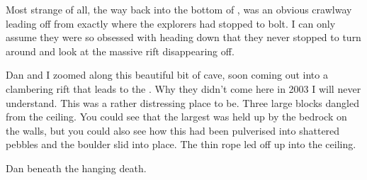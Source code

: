 Most strange of all, the way back into the bottom of ,  was an obvious crawlway leading off
from exactly where the  explorers had stopped to bolt.
I can only assume they were so obsessed with heading down that they
never stopped to turn around and look at the massive rift disappearing
off.

Dan and I zoomed along this beautiful bit of cave, soon coming out into
a clambering rift that leads to the . Why they
didn't come here in 2003 I will never understand. This was a rather
distressing place to be. Three large blocks dangled from the ceiling.
You could see that the largest was held up by the bedrock on the walls,
but you could also see how this had been pulverised into shattered
pebbles and the boulder slid into place. The thin rope led off up into
the ceiling.


\begin{marginfigure}
\checkoddpage \ifoddpage \forcerectofloat \else \forceversofloat \fi
\centering
 \caption{Dan beneath the hanging death. }
 \label{Hanging Garden}
\end{marginfigure}


